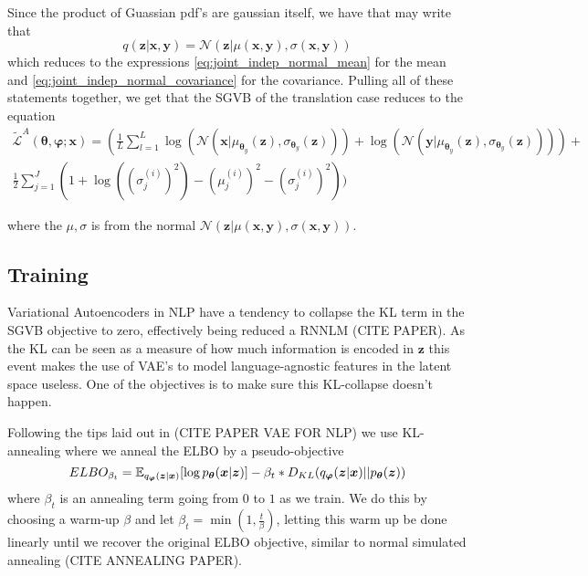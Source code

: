 Since the product of Guassian pdf's are gaussian itself, we have that may write
that
\begin{equation*}
  q(\bm{z} | \bm{x}, \bm{y}) = \mathcal{N}(\bm{z} | \mu(\bm{x}, \bm{y}), \sigma(\bm{x}, \bm{y}))
\end{equation*} which reduces to the expressions
\ref{eq:joint_indep_normal_mean} for the mean and
\ref{eq:joint_indep_normal_covariance} for the covariance.
Pulling all of these statements together, we get that the SGVB of the
translation case reduces to the equation
\begin{equation}
  \begin{split}
  \label{eq:translation_SGVB}
  \tilde{\mathcal{L}}^A(\bm{\theta}, \bm{\varphi}; \bm{x}) = (\frac{1}{L} \sum_{l=1}^L \log(\mathcal{N}(\bm{x} | \mu_{\bm{\theta}_y}(\bm{z}), \sigma_{\bm{\theta}_y}(\bm{z}))) + \log(\mathcal{N}(\bm{y} | \mu_{\bm{\theta}_y}(\bm{z}), \sigma_{\bm{\theta}_y}(\bm{z})))) + \\ \frac{1}{2} \sum_{j=1}^J(1 + \log((\sigma_j^{(i)})^2) - (\mu_j^{(i)})^2 - (\sigma_j^{(i)})^2))
  \end{split}
\end{equation}

where the $\mu, \sigma$ is from the normal $\mathcal{N}(\bm{z} | \mu(\bm{x},
\bm{y}), \sigma(\bm{x}, \bm{y}))$.

\subsection{Training}
Variational Autoencoders in NLP have a tendency to collapse the KL term in the SGVB
objective to zero, effectively being reduced a RNNLM (CITE PAPER). As the KL can
be seen as a measure of how much information is encoded in $\bm{z}$ this event
makes the use of VAE's to model language-agnostic features in the latent space
useless. One of the objectives is to make sure this KL-collapse doesn't happen.

Following the tips laid out in (CITE PAPER VAE FOR NLP) we use KL-annealing
where we anneal the ELBO by a pseudo-objective
\begin{equation}
  \label{eq:KL_annealing_ELBO}
  ELBO_{\beta_t} = \operatorname{\mathbb{E}}_{q_{\bm{\varphi}}(\bm{z} | \bm{x})}[\log p_{\bm{\theta}}(\bm{x} | \bm{z})] - \beta_t * D_{KL}(q_{\bm{\varphi}}(\bm{z} | \bm{x}) || p_{\bm{\theta}}(\bm{z}))
\end{equation}
where $\beta_t$ is an annealing term going from $0$ to $1$ as we train. We do
this by choosing a warm-up $\beta$ and let $\beta_t = \min(1, \frac{t}{\beta})$,
letting this warm up be done linearly until we recover the original ELBO
objective, similar to normal simulated annealing (CITE ANNEALING PAPER).

